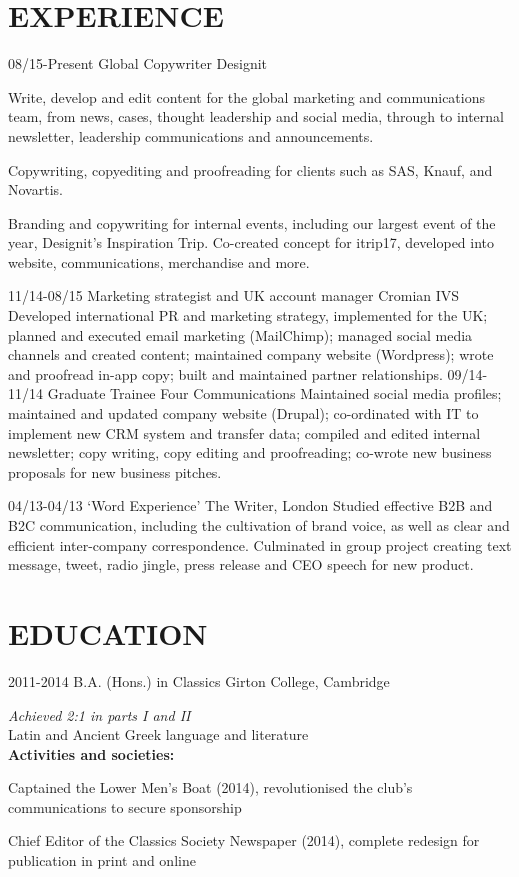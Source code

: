 \documentclass[]{friggeri-cv}
\begin{document}
\section{EXPERIENCE}

\begin{entrylist}
  \entry
  {08/15-Present}
  {Global Copywriter}
  {Designit}
  {
  	 Write, develop and edit content for the global marketing and communications team, from news, cases, thought leadership and social media, through to internal newsletter, leadership communications and announcements. 

  Copywriting, copyediting and proofreading for clients such as SAS, Knauf, and Novartis.
  
  Branding and copywriting for internal events, including our largest event of the year, Designit's Inspiration Trip. Co-created concept for itrip17, developed into website, communications, merchandise and more.}
  \entry
  {11/14-08/15}
  {Marketing strategist and UK account manager}
  {Cromian IVS}
  {Developed international PR and marketing strategy, implemented for the UK; planned and executed email marketing (MailChimp); managed social media channels and created content; maintained company website (Wordpress); wrote and proofread in-app copy; built and maintained partner relationships.}
  \entry
  {09/14-11/14}
  {Graduate Trainee}
  {Four Communications}
  {Maintained social media profiles; maintained and updated company website (Drupal); co-ordinated with IT to implement new CRM system and transfer data; compiled and edited internal newsletter; copy writing, copy editing and proofreading; co-wrote new business proposals for new business pitches.}
\end{entrylist}
\begin{entrylist}
  \entry
  {04/13-04/13}
  {‘Word Experience’}
  {The Writer, London}
  {Studied effective B2B and B2C communication, including the cultivation of brand voice, as well as clear and efficient inter-company correspondence. Culminated in group project creating text message, tweet, radio jingle, press release and CEO speech for new product.}
\end{entrylist}

\pagebreak

\section{EDUCATION}

\begin{entrylist}
	\entry
	{2011-2014}
	{B.A. (Hons.) in Classics}
	{Girton College, Cambridge}
	{\emph{Achieved 2:1 in parts I and II}
	\\
	
	Latin and Ancient Greek language and literature
	\\
	
	\textbf{Activities and societies:} 
	
	Captained the Lower Men's Boat (2014), revolutionised the club's communications to secure sponsorship
	
	Chief Editor of the Classics Society Newspaper (2014), complete redesign for publication in print and online
	}
\end{entrylist}
\end{document}
